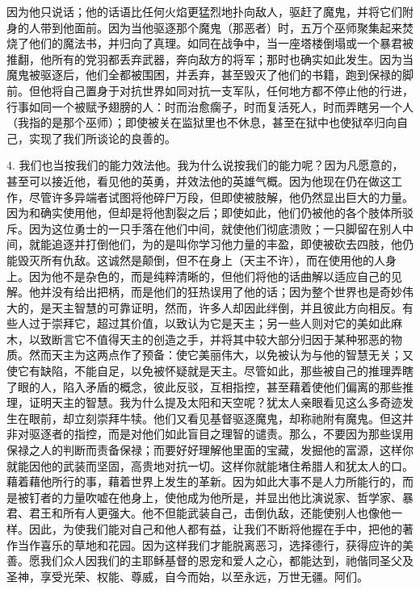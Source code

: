 因为他只说话；他的话语比任何火焰更猛烈地扑向敌人，驱赶了魔鬼，并将它们附身的人带到他面前。因为当他驱逐那个魔鬼（那恶者）时，五万个巫师聚集起来焚烧了他们的魔法书，并归向了真理。如同在战争中，当一座塔楼倒塌或一个暴君被推翻，他所有的党羽都丢弃武器，奔向敌方的将军；那时也确实如此发生。因为当魔鬼被驱逐后，他们全都被围困，并丢弃，甚至毁灭了他们的书籍，跑到保禄的脚前。但他将自己置身于对抗世界如同对抗一支军队，任何地方都不停止他的行进，行事如同一个被赋予翅膀的人：时而治愈瘸子，时而复活死人，时而弄瞎另一个人（我指的是那个巫师）；即使被关在监狱里也不休息，甚至在狱中也使狱卒归向自己，实现了我们所谈论的良善的。\par

4. 我们也当按我们的能力效法他。我为什么说按我们的能力呢？因为凡愿意的，甚至可以接近他，看见他的英勇，并效法他的英雄气概。因为他现在仍在做这工作，尽管许多异端者试图将他碎尸万段，但即使被肢解，他仍然显出巨大的力量。因为和确实使用他，但却是将他割裂之后；即使如此，他们仍被他的各个肢体所驳斥。因为这位勇士的一只手落在他们中间，就使他们彻底溃败；一只脚留在别人中间，就能追逐并打倒他们，为的是叫你学习他力量的丰盈，即使被砍去四肢，他仍能毁灭所有仇敌。这诚然是颠倒，但不在身上（天主不许），而在使用他的人身上。因为他不是杂色的，而是纯粹清晰的，但他们将他的话曲解以适应自己的见解。他并没有给出把柄，而是他们的狂热误用了他的话；因为整个世界也是奇妙伟大的，是天主智慧的可靠证明，然而，许多人却因此绊倒，并且彼此方向相反。有些人过于崇拜它，超过其价值，以致认为它是天主；另一些人则对它的美如此麻木，以致断言它不值得天主的创造之手，并将其中较大部分归因于某种邪恶的物质。然而天主为这两点作了预备：使它美丽伟大，以免被认为与他的智慧无关；又使它有缺陷，不能自足，以免被怀疑就是天主。尽管如此，那些被自己的推理弄瞎了眼的人，陷入矛盾的概念，彼此反驳，互相指控，甚至藉着使他们偏离的那些推理，证明天主的智慧。我为什么提及太阳和天空呢？犹太人亲眼看见这么多奇迹发生在眼前，却立刻崇拜牛犊。他们又看见基督驱逐魔鬼，却称祂附有魔鬼。但这并非对驱逐者的指控，而是对他们如此盲目之理智的谴责。那么，不要因为那些误用保禄之人的判断而责备保禄；而要好好理解他里面的宝藏，发掘他的富源，这样你就能因他的武装而坚固，高贵地对抗一切。这样你就能堵住希腊人和犹太人的口。藉着藉他所行的事，藉着世界上发生的革新。因为如此大事不是人力所能行的，而是被钉者的力量吹嘘在他身上，使他成为他所是，并显出他比演说家、哲学家、暴君、君王和所有人更强大。他不但能武装自己，击倒仇敌，还能使别人也像他一样。因此，为使我们能对自己和他人都有益，让我们不断将他握在手中，把他的著作当作喜乐的草地和花园。因为这样我们才能脱离恶习，选择德行，获得应许的美善。愿我们众人因我们的主耶稣基督的恩宠和爱人之心，都能达到，祂偕同圣父及圣神，享受光荣、权能、尊威，自今而始，以至永远，万世无疆。阿们。\par

